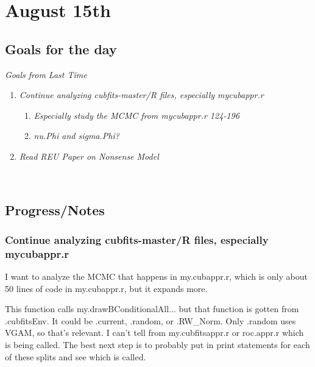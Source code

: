 



\setcounter{section}{14}
\setcounter{subsection}{-1}
\setcounter{subsubsection}{0}

\section{August 15th}
\subsection{Goals for the day}
\textit{Goals from Last Time}
\begin{enumerate}
\item \textit{Continue analyzing cubfits-master/R files, especially mycubappr.r}

\begin{enumerate}
\item \textit{Especially study the MCMC from mycubappr.r 124-196}
\item \textit{nu.Phi and sigma.Phi?}
\end{enumerate}

\item \textit{Read REU Paper on Nonsense Model}

~



\end{enumerate}


\subsection{Progress/Notes}

\subsubsection{Continue analyzing cubfits-master/R files, especially mycubappr.r}

I want to analyze the MCMC that happens in my.cubappr.r, which is only about 50 lines of code in my.cubappr.r, but it expands more.

This function calls my.drawBConditionalAll... but that function is gotten from .cubfitsEnv. It could be .current, .random, or .RW\_Norm. Only .random uses VGAM, so that's relevant. I can't tell from my.cubfitsappr.r or roc.appr.r which is being called. The best next step is to probably put in print statements for each of these splits and see which is called.

